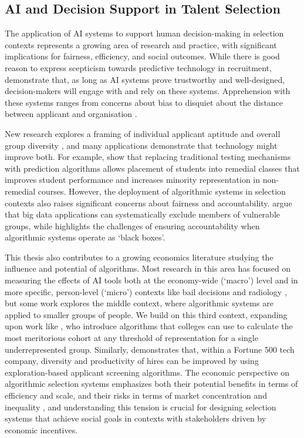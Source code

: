 \subsection{AI and Decision Support in Talent Selection}\label{ssec:context_ai_talent_selection}
The application of AI systems to support human decision-making in selection contexts represents a growing area of research and practice, with significant implications for fairness, efficiency, and social outcomes. While there is good reason to express scepticism towards predictive technology in recruitment, \textcite{Vereschak_Alizadeh_Bailly_Caramiaux_2024} demonstrate that, as long as AI systems prove trustworthy and well-designed, decision-makers will engage with and rely on these systems. Apprehension with these systems ranges from concerns about bias to disquiet about the distance between applicant and organisation \cite{Lashkari_Cheng_2023}.

New research explores a framing of individual applicant aptitude and overall group diversity \cite{noray2023systemic}, and many applications demonstrate that technology might improve both. For example, \textcite{bergman2021seven} show that replacing traditional testing mechanisms with prediction algorithms allows placement of students into remedial classes that improves student performance and increases minority representation in non-remedial courses. However, the deployment of algorithmic systems in selection contexts also raises significant concerns about fairness and accountability. \textcite{barocas_big_2016} argue that big data applications can systematically exclude members of vulnerable groups, while \textcite{pasquale2015black} highlights the challenges of ensuring accountability when algorithmic systems operate as `black boxes'.

This thesis also contributes to a growing economics literature studying the influence and potential of algorithms. Most research in this area has focused on measuring the effects of AI tools both at the economy-wide (`macro') level \cite{acemoglu2022automation,babina2024artificial} and in more specific, person-level (`micro') contexts like bail decisions and radiology \cite{albright2023hidden,kleinberg2015prediction,stevenson2019algorithmic}, but some work explores the middle context, where algorithmic systems are applied to smaller groups of people. We build on this third context, expanding upon work like \textcite{kleinberg2018algorithmic}, who introduce algorithms that colleges can use to calculate the most meritorious cohort at any threshold of representation for a single underrepresented group. Similarly, \textcite{li2020hiring} demonstrates that, within a Fortune 500 tech company, diversity and productivity of hires can be improved by using exploration-based applicant screening algorithms. The economic perspective on algorithmic selection systems emphasizes both their potential benefits in terms of efficiency and scale, and their risks in terms of market concentration and inequality \cite{li2020hiring,kleinberg2018algorithmic,noray2023systemic}, and understanding this tension is crucial for designing selection systems that achieve social goals in contexts with stakeholders driven by economic incentives.

